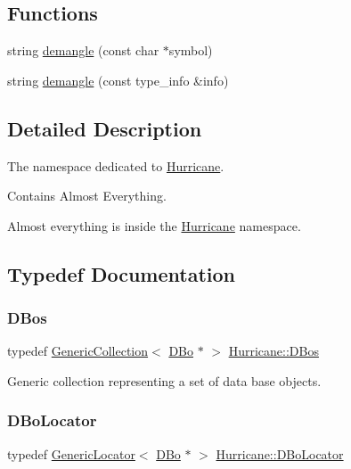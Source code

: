 \subsection*{Functions}
\begin{DoxyCompactItemize}
\item 
string \hyperlink{group__Generalities_ga93af87d1b7b19294382ba6dae51d0363}{demangle} (const char $\ast$symbol)
\item 
string \hyperlink{group__Generalities_gae4be209e8a3f2227b0c7a22246817c6f}{demangle} (const type\+\_\+info \&info)
\end{DoxyCompactItemize}


\subsection{Detailed Description}
The namespace dedicated to \hyperlink{namespaceHurricane}{Hurricane}. 

Contains Almost Everything.

Almost everything is inside the \hyperlink{namespaceHurricane}{Hurricane} namespace. 

\subsection{Typedef Documentation}
\mbox{\label{namespaceHurricane_a0aa3882e095f9d425c253223d1c0793d}} 
\subsubsection{\texorpdfstring{D\+Bos}{DBos}}
{\footnotesize\ttfamily typedef \hyperlink{classHurricane_1_1GenericCollection}{Generic\+Collection}$<$ \hyperlink{classHurricane_1_1DBo}{D\+Bo} $\ast$ $>$ \hyperlink{namespaceHurricane_a0aa3882e095f9d425c253223d1c0793d}{Hurricane\+::\+D\+Bos}}

Generic collection representing a set of data base objects. \mbox{\label{namespaceHurricane_a7d70ef7ad837859e453171feb692535c}} 
\subsubsection{\texorpdfstring{D\+Bo\+Locator}{DBoLocator}}
{\footnotesize\ttfamily typedef \hyperlink{classHurricane_1_1GenericLocator}{Generic\+Locator}$<$ \hyperlink{classHurricane_1_1DBo}{D\+Bo} $\ast$ $>$ \hyperlink{namespaceHurricane_a7d70ef7ad837859e453171feb692535c}{Hurricane\+::\+D\+Bo\+Locator}}

